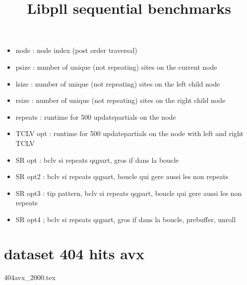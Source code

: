 \documentclass[a4paper]{article}
\begin{document}
\newcommand*{\figuretitle}[1]{%
    {\centering%
    \textbf{#1}%
    \par\medskip}%
}


\title{Libpll sequential benchmarks}
\maketitle


\begin{itemize}
\item node : node index (post order traversal)
\item psize : number of unique (not repeating) sites on the current node
\item lsize : number of unique (not repeating) sites on the left child node
\item rsize : number of unique (not repeating) sites on the right child node
\item repeats : runtime for 500 updatepartials on the node
\item TCLV opt : runtime for 500 updatepartials on the node with left and right TCLV
\end{itemize}



\begin{itemize}
\item SR opt : bclv si repeats qqpart, gros if dans la boucle
\item SR opt2 :  bclv si repeats qqpart, boucle qui gere aussi les non repeats
\item SR opt3 : tip pattern, bclv si repeats qqpart, boucle qui gere aussi les non repeats
\item SR opt4 ; bclv si repeats qqpart, gros if dans la boucle, prebuffer, unroll
\end{itemize}


\section{dataset 404 hits avx}
%
{404avx_2000.tex}
\end{document}
